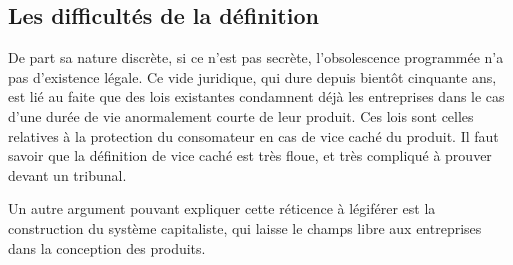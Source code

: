 \subsection{Les difficultés de la définition}

De part sa nature discrète, si ce n'est pas secrète, l'obsolescence programmée n'a pas d'existence légale. Ce vide juridique, qui dure depuis bientôt cinquante ans, est lié au faite que des lois existantes condamnent déjà les entreprises dans le cas d'une durée de vie anormalement courte de leur produit. Ces lois sont celles relatives à la protection du consomateur en cas de vice caché du produit. Il faut savoir que la définition de vice caché est très floue, et très compliqué à prouver devant un tribunal.

Un autre argument pouvant expliquer cette réticence à légiférer est la construction du système capitaliste, qui laisse le champs libre aux entreprises dans la conception des produits.
